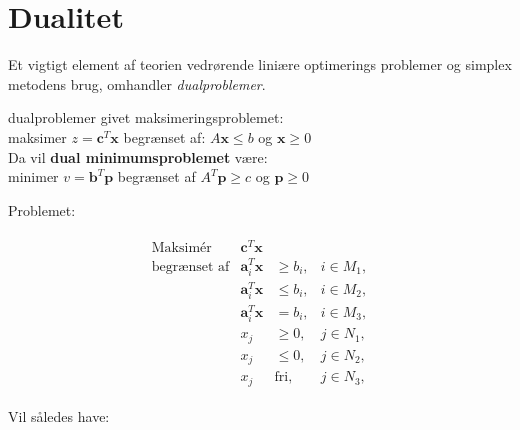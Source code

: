 \section{Dualitet}

Et vigtigt element af teorien vedrørende liniære optimerings problemer og simplex metodens brug, omhandler \textit{dualproblemer}.

\begin{defn}{}{dualproblemer}
givet maksimeringsproblemet: \\
maksimer $z=\mathbf{c}^T \mathbf{x}$ begrænset af: $A\mathbf{x} \leq b$ og $\mathbf{x} \geq 0$ \\
Da vil \textbf{dual minimumsproblemet} være: \\
minimer $v=\mathbf{b}^T \mathbf{p}$ begrænset af $A^T \mathbf{p} \geq c$ og $\mathbf{p} \geq 0$
\end{defn}
Problemet:

\begin{align*}
\begin{array}{lrll}
\text{Maksimér}		&\textbf{c}^T\textbf{x}	&			&\\
\text{begrænset af}	&\textbf{a}_i^T\textbf{x}	&\geq b_i,	&i \in M_1,\\
					&\textbf{a}_i^T\textbf{x}	&\leq b_i,	&i \in M_2,\\
					&\textbf{a}_i^T\textbf{x}	& = b_i,	&i \in M_3,\\
					&x_j					&\geq 0,	&j \in N_1,\\
					&x_j					&\leq 0,	&j \in N_2,\\							&x_j					&\text{fri},	&j \in N_3,
\end{array}
\end{align*}

Vil således have:


